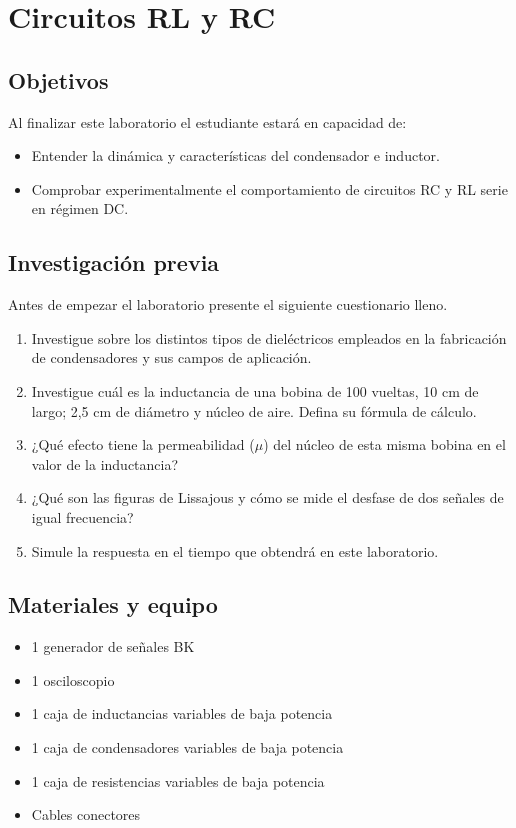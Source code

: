 \documentclass[12pt,letterpaper]{report}
\newcommand{\obj}{Objetivos}
\newcommand{\inv}{Investigación previa}
\newcommand{\mat}{Materiales y equipo}
\newcommand{\capacidad}{Al finalizar este laboratorio el estudiante estará en capacidad de:}
\newcommand{\antesde}{Antes de empezar el laboratorio presente el siguiente cuestionario lleno.}
\begin{document}
\chapter{Circuitos RL y RC}

\section{\obj}
\capacidad
\begin{itemize}
\item Entender la dinámica y características del condensador e inductor.
\item Comprobar experimentalmente el comportamiento de circuitos RC y RL serie
en régimen DC.
\end{itemize}

\section{\inv}
\antesde
\begin{enumerate}
\item Investigue sobre los distintos tipos de dieléctricos empleados en la
fabricación de condensadores y sus campos de aplicación.
\item Investigue cuál es la inductancia de una bobina de 100 vueltas, 10 cm de
largo; 2,5 cm de diámetro y núcleo de aire. Defina su fórmula de cálculo.
\item ¿Qué efecto tiene la permeabilidad ($\mu$) del núcleo de esta misma bobina en
el valor de la inductancia?
\item ¿Qué son las figuras de Lissajous y cómo se mide el desfase de dos señales
de igual frecuencia?
\item Simule la respuesta en el tiempo que obtendrá en este laboratorio.
\end{enumerate}

\section{\mat}
\begin{itemize}
\item 1 generador de señales BK
\item 1 osciloscopio
\item 1 caja de inductancias variables de baja potencia
\item 1 caja de condensadores variables de baja potencia
\item 1 caja de resistencias variables de baja potencia
\item Cables conectores
\end{itemize}
\end{document}
